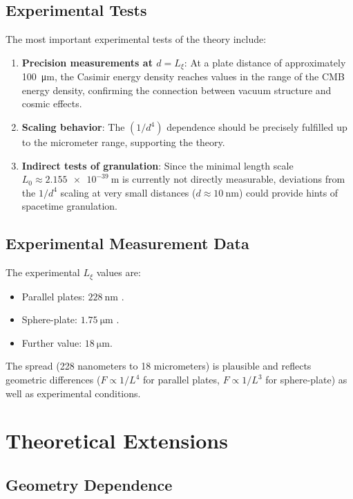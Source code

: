 	\subsection{Experimental Tests}
	
	The most important experimental tests of the theory include:
	
	\begin{enumerate}
		\item \textbf{Precision measurements at \( d = L_\xi \)}: At a plate distance of approximately \SI{100}{\micro\meter}, the Casimir energy density reaches values in the range of the CMB energy density, confirming the connection between vacuum structure and cosmic effects.
		\item \textbf{Scaling behavior}: The \( (1/d^4) \) dependence should be precisely fulfilled up to the micrometer range, supporting the theory.
		\item \textbf{Indirect tests of granulation}: Since the minimal length scale \( L_0 \approx \SI{2.155e-39}{\meter} \) is currently not directly measurable, deviations from the \( 1/d^4 \) scaling at very small distances (\( d \approx \SI{10}{\nano\meter} \)) could provide hints of spacetime granulation.
	\end{enumerate}
	
	\subsection{Experimental Measurement Data}
	
	The experimental \( L_\xi \) values are:
	\begin{itemize}
		\item Parallel plates: \( \SI{228}{\nano\meter} \) \cite{dhital2024}.
		\item Sphere-plate: \( \SI{1.75}{\micro\meter} \) \cite{xu2022}.
		\item Further value: \( \SI{18}{\micro\meter} \).
	\end{itemize}
	
	The spread (228 nanometers to 18 micrometers) is plausible and reflects geometric differences (\( F \propto 1/L^4 \) for parallel plates, \( F \propto 1/L^3 \) for sphere-plate) as well as experimental conditions.
	
	\section{Theoretical Extensions}
	
	\subsection{Geometry Dependence}
	
